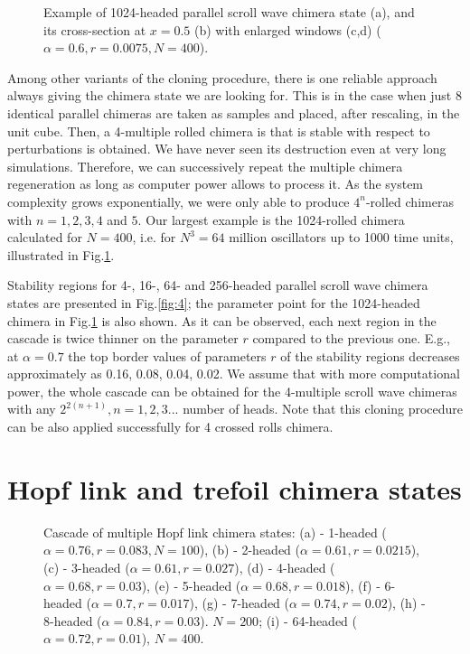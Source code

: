 \documentclass[epjST]{svjour}
\begin{document}
\begin{figure}[ht!]
\caption{Example of 1024-headed parallel scroll wave chimera state (a), and its cross-section at $x=0.5$ (b) with enlarged windows (c,d) ($\alpha=0.6, r=0.0075, N=400$).}
  \label{fig:5} 
\end{figure}



Among other variants of the cloning procedure, there is one reliable approach always giving the chimera state we are looking for. This is in the case when just 8 identical  parallel chimeras are taken as samples and placed, after rescaling, in the unit cube. Then, a 4-multiple rolled chimera is that is stable with respect to perturbations is obtained. We have never seen its destruction even at very long simulations.  Therefore, we can successively repeat the multiple  chimera regeneration as long as computer power allows to process it.  As the system complexity grows exponentially, we were only able to produce $4^n$-rolled chimeras with $n=1,2,3,4$ and $5$.  Our largest example is the 1024-rolled chimera calculated for $N=400$, i.e. for  $N^3=64$ million  oscillators up to 1000 time units, illustrated in Fig.\ref{fig:5}.



Stability regions for 4-, 16-, 64- and 256-headed  parallel scroll wave chimera states
are presented in Fig.\ref{fig:4}; the parameter point for the 1024-headed chimera in Fig.\ref{fig:5} is also shown.  As it can be observed,  each next region in the cascade is twice thinner on the parameter $r$ compared to the previous one. 
E.g.,  at $\alpha=0.7$ the top border values of parameters $r$  of the stability regions decreases approximately as 0.16, 0.08,  0.04, 0.02. 
We assume that with more computational power,  the whole cascade  can be obtained  for the 4-multiple scroll wave chimeras with any $2^{2(n+1)}, n=1,2,3...$ number of heads. Note that this cloning procedure can be also applied successfully for 4 crossed rolls chimera.




\section {Hopf link and trefoil chimera states}
\label{sec:3}

\begin{figure}[ht!]
\caption{Cascade of multiple Hopf link chimera states:  (a) - 1-headed ($\alpha=0.76, r=0.083, N=100$), (b) - 2-headed ($\alpha=0.61, r=0.0215 $), (c) - 3-headed ($\alpha=0.61, r=0.027$), (d) - 4-headed ($\alpha=0.68, r=0.03$),  (e) - 5-headed ($\alpha=0.68, r=0.018$), (f) - 6-headed ($\alpha=0.7, r=0.017$),  (g) - 7-headed ($\alpha=0.74, r=0.02$), (h) - 8-headed ($\alpha=0.84, r=0.03$). $N=200$; (i) - 64-headed ($\alpha=0.72, r=0.01$), $N=400$.} 
\label{fig:6}
\end{figure}
\end{document}
